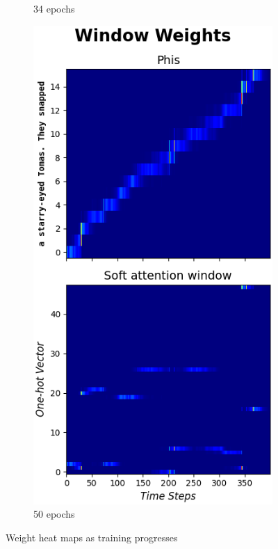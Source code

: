 \documentclass{article}
\begin{document}
\begin{figure}[hbt!]
\begin{subfigure}[b]{0.24\textwidth}
         \caption{34 epochs}
         \label{fig:weight_heatmaps:c}
     \end{subfigure}
     \hfill
     \begin{subfigure}[b]{0.24\textwidth}
         \centering
         \includegraphics[width=\textwidth]{heatmap_weights_303}
         \caption{50 epochs}
         \label{fig:weight_heatmaps:d}
     \end{subfigure}

    \caption{Weight heat maps as training progresses}
    \label{fig:weight_heatmaps}
\end{figure}
\end{document}
